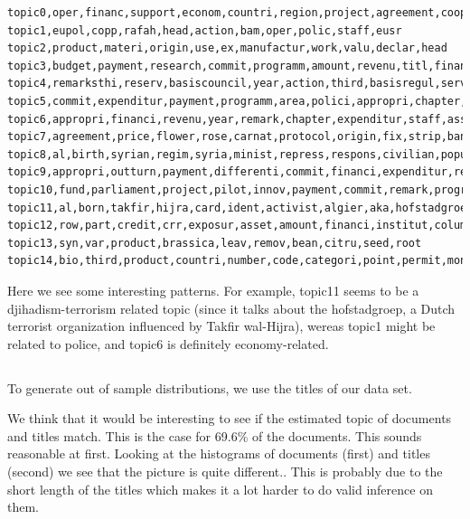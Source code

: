 \documentclass{article}
\begin{document}
\begin{lstlisting}
topic0,oper,financ,support,econom,countri,region,project,agreement,cooper,provis
topic1,eupol,copp,rafah,head,action,bam,oper,polic,staff,eusr
topic2,product,materi,origin,use,ex,manufactur,work,valu,declar,head
topic3,budget,payment,research,commit,programm,amount,revenu,titl,financi,will
topic4,remarksthi,reserv,basiscouncil,year,action,third,basisregul,servic,project,train
topic5,commit,expenditur,payment,programm,area,polici,appropri,chapter,action,countri
topic6,appropri,financi,revenu,year,remark,chapter,expenditur,staff,assign,servic
topic7,agreement,price,flower,rose,carnat,protocol,origin,fix,strip,bank
topic8,al,birth,syrian,regim,syria,minist,repress,respons,civilian,popul
topic9,appropri,outturn,payment,differenti,commit,financi,expenditur,research,legal,programm
topic10,fund,parliament,project,pilot,innov,payment,commit,remark,programm,financi
topic11,al,born,takfir,hijra,card,ident,activist,algier,aka,hofstadgroep
topic12,row,part,credit,crr,exposur,asset,amount,financi,institut,column
topic13,syn,var,product,brassica,leav,remov,bean,citru,seed,root
topic14,bio,third,product,countri,number,code,categori,point,permit,month
\end{lstlisting}


Here we see some interesting patterns. For example, topic11 seems to be a djihadism-terrorism related topic (since it talks about the hofstadgroep, a Dutch terrorist organization influenced by Takfir wal-Hijra), wereas topic1 might be related to police, and topic6 is definitely economy-related. 

\subsection{}

To generate out of sample distributions, we use the titles of our data set. 

We think that it would be interesting to see if the estimated topic of documents and titles match. This is the case for 69.6\% of the documents. This sounds reasonable at first. Looking at the histograms of documents (first) and titles (second) we see that the picture is quite different.. This is probably due to the short length of the titles which makes it a lot harder to do valid inference on them. 
\end{document}
